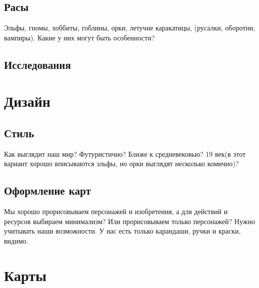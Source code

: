 \documentclass[a4paper,12pt]{article}
\begin{document}
    \subsection{Расы}

      Эльфы, гномы, хоббиты, гоблины, орки, летучие каракатицы, (русалки, оборотни, вампиры). Какие у них могут быть особенности?

    \subsection{Исследования}
  \section{Дизайн}
    \subsection{Стиль}
      Как выглядит наш мир? Футуристично? Ближе к средневековью? 19 век(в этот вариант хорошо вписываются эльфы, но орки выглядят несколько комично)?
    \subsection{Оформление карт}
      Мы хорошо прорисовываем персонажей и изобретения, а для действий и ресурсов выбираем минимализм? Или прорисовываем только персонажей? Нужно учитывать наши возможности. У нас есть только карандаши, ручки и краски, видимо.

    \newpage

    \section{Карты}
\end{document}
